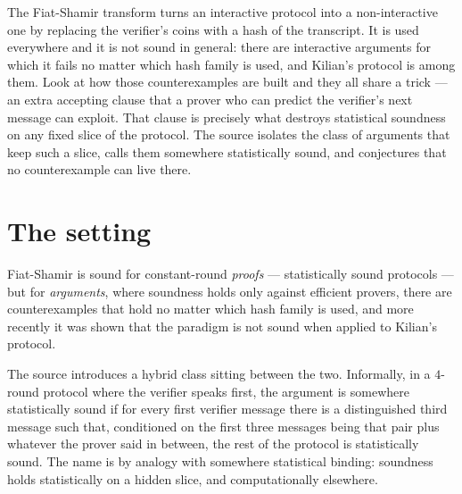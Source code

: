 \documentclass{aicr-conjecture}
\begin{document}

\vspace{0.4em}

\begin{informalconjecture}
The Fiat-Shamir transform turns an interactive protocol into a
non-interactive one by replacing the verifier's coins with a hash of the
transcript. It is used everywhere and it is not sound in general: there
are interactive arguments for which it fails no matter which hash family
is used, and Kilian's protocol is among them. Look at how those
counterexamples are built and they all share a trick --- an extra
accepting clause that a prover who can predict the verifier's next
message can exploit. That clause is precisely what destroys statistical
soundness on any fixed slice of the protocol. The source isolates the
class of arguments that keep such a slice, calls them somewhere
statistically sound, and conjectures that no counterexample can live
there.
\end{informalconjecture}

\section{The setting}\label{sec:setting}

Fiat-Shamir is sound for constant-round \emph{proofs} --- statistically
sound protocols --- but for \emph{arguments}, where soundness holds only
against efficient provers, there are counterexamples that hold no matter
which hash family is used, and more recently it was shown that the
paradigm is not sound when applied to Kilian's protocol.

The source introduces a hybrid class sitting between the two. Informally,
in a $4$-round protocol where the verifier speaks first, the argument is
somewhere statistically sound if for every first verifier message there
is a distinguished third message such that, conditioned on the first
three messages being that pair plus whatever the prover said in between,
the rest of the protocol is statistically sound. The name is by analogy
with somewhere statistical binding: soundness holds statistically on a
hidden slice, and computationally elsewhere.
\end{document}
